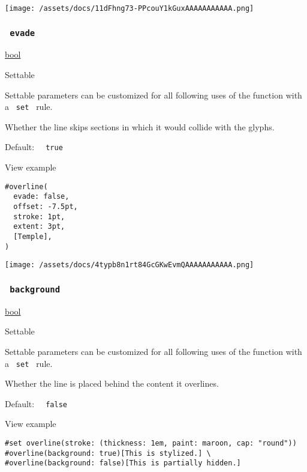 \texttt{[image: /assets/docs/11dFhng73-PPcouY1kGuxAAAAAAAAAAA.png]}

\subsubsection{\texorpdfstring{\texttt{\ evade\ }}{ evade }}\label{parameters-evade}

\href{/docs/reference/foundations/bool/}{bool}

{{ Settable }}

\label{parameters-evade-settable-tooltip}
Settable parameters can be customized for all following uses of the
function with a \texttt{\ set\ } rule.

Whether the line skips sections in which it would collide with the
glyphs.

Default: \texttt{\ }{\texttt{\ true\ }}\texttt{\ }


View example

\begin{verbatim}
#overline(
  evade: false,
  offset: -7.5pt,
  stroke: 1pt,
  extent: 3pt,
  [Temple],
)
\end{verbatim}

\texttt{[image: /assets/docs/4typb8n1rt84GcGKwEvmQAAAAAAAAAAA.png]}

\subsubsection{\texorpdfstring{\texttt{\ background\ }}{ background }}\label{parameters-background}

\href{/docs/reference/foundations/bool/}{bool}

{{ Settable }}

\label{parameters-background-settable-tooltip}
Settable parameters can be customized for all following uses of the
function with a \texttt{\ set\ } rule.

Whether the line is placed behind the content it overlines.

Default: \texttt{\ }{\texttt{\ false\ }}\texttt{\ }


View example

\begin{verbatim}
#set overline(stroke: (thickness: 1em, paint: maroon, cap: "round"))
#overline(background: true)[This is stylized.] \
#overline(background: false)[This is partially hidden.]
\end{verbatim}

